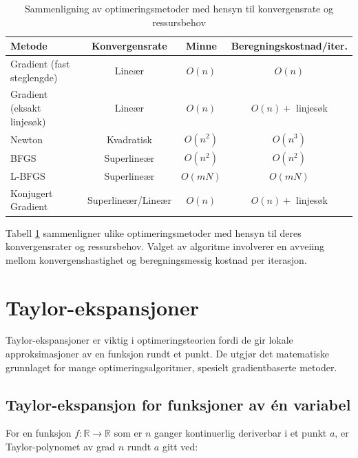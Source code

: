 \begin{table}[H]
	\centering
	\begin{tabular}{|l|c|c|c|}
		\hline
		\textbf{Metode}            & \textbf{Konvergensrate} & \textbf{Minne} & \textbf{Beregningskostnad/iter.} \\
		\hline
		Gradient (fast steglengde) & Lineær                  & \(O(n)\)       & \(O(n)\)                         \\
		Gradient (eksakt linjesøk) & Lineær                  & \(O(n)\)       & \(O(n) + \) linjesøk             \\
		Newton                     & Kvadratisk              & \(O(n^2)\)     & \(O(n^3)\)                       \\
		BFGS                       & Superlineær             & \(O(n^2)\)     & \(O(n^2)\)                       \\
		L-BFGS                     & Superlineær             & \(O(mN)\)      & \(O(mN)\)                        \\
		Konjugert Gradient         & Superlineær/Lineær      & \(O(n)\)       & \(O(n) + \) linjesøk             \\
		\hline
	\end{tabular}
	\caption{Sammenligning av optimeringsmetoder med hensyn til konvergensrate og ressursbehov}
	\label{tab:method_comparison}
\end{table}

Tabell \ref{tab:method_comparison} sammenligner ulike optimeringsmetoder med hensyn til deres konvergensrater og ressursbehov. Valget av algoritme involverer en avveiing mellom konvergenshastighet og beregningsmessig kostnad per iterasjon.

\section{Taylor-ekspansjoner}
\label{sec:taylor_expansion}

Taylor-ekspansjoner er viktig i optimeringsteorien fordi de gir lokale approksimasjoner av en funksjon rundt et punkt. De utgjør det matematiske grunnlaget for mange optimeringsalgoritmer, spesielt gradientbaserte metoder.

\subsection{Taylor-ekspansjon for funksjoner av én variabel}

For en funksjon $f: \mathbb{R} \to \mathbb{R}$ som er $n$ ganger kontinuerlig deriverbar i et punkt $a$, er Taylor-polynomet av grad $n$ rundt $a$ gitt ved:

